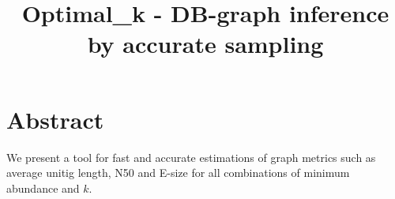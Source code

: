 \documentclass[a4paper,6pt]{article}
\begin{document}
\title{Optimal\_k - DB-graph inference by accurate sampling} 
\author{}
\date{} %
\maketitle

\section{Abstract}
We present a tool for fast and accurate estimations of graph metrics such as average unitig length, N50 and E-size for all combinations of minimum abundance and $k$. 
\end{document}

